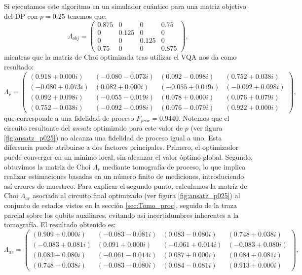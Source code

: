 \documentclass[letterpaper,12pt]{thesisECFM}
\theoremstyle{plain}
\theoremstyle{definition}
\theoremstyle{definition}
\theoremstyle{remark}
\newcommand{\1}{\mathbb{1}}
\begin{document}
Si ejecutamos este algoritmo en un simulador cuántico para una matriz objetivo del DP con $p=0.25$ tenemos que:
\begin{equation}
    \Lambda_{obj} = \begin{pmatrix}
0.875 & 0 & 0 & 0.75 \\
0 & 0.125 & 0 & 0 \\
0 & 0 & 0.125 & 0 \\
0.75 & 0 & 0 & 0.875
\end{pmatrix},
\end{equation}
mientras que la matriz de Choi optimizada tras utilizar el VQA nos da como
resultado:  
\begin{equation}
  \Lambda_r =  \begin{pmatrix}
(0.918 + 0.000i) & (-0.080 - 0.073i) & (0.092 - 0.098i) & (0.752 + 0.038i) \\
(-0.080 + 0.073i) & (0.082 + 0.000i) & (-0.055 + 0.019i) & (-0.092 + 0.098i) \\
(0.092 + 0.098i) & (-0.055 - 0.019i) & (0.078 + 0.000i) & (0.076 + 0.079i) \\
(0.752 - 0.038i) & (-0.092 - 0.098i) & (0.076 - 0.079i) & (0.922 + 0.000i)
\end{pmatrix},
\end{equation}
que corresponde a una fidelidad de proceso $F_{proc}= 0.9440$. Notemos que el
circuito resultante del \textit{ansatz} optimizado para este valor de $p$ (ver figura
\ref{fig:ansatz_p025}) no alcanza una fidelidad de proceso igual a uno. Esta diferencia puede atribuirse a dos factores principales. Primero, el optimizador puede converger en un mínimo local, sin alcanzar el valor óptimo global. Segundo, obtuvimos la matriz de Choi $\Lambda_r$ mediante tomografía de proceso, lo que implica realizar estimaciones basadas en un número finito de mediciones, introduciendo así errores de muestreo. Para explicar el segundo punto, calculamos la matriz de Choi $\Lambda_{ar}$ asociada al circuito final optimizado (ver figura \ref{fig:ansatz_p025}) al conjunto de estados vistos en la sección \ref{sec:Tomo_proc}, seguido de la traza parcial sobre los qubits auxiliares, evitando así incertidumbres inherentes a la tomografía. El resultado obtenido es:
\begin{equation}
    \Lambda_{ar} =  \begin{pmatrix}
(0.909 + 0.000i) & (-0.083 - 0.081i) & (0.083 - 0.080i) & (0.748 + 0.038i) \\
(-0.083 + 0.081i) & (0.091 + 0.000i) & (-0.061 + 0.014i) & (-0.083 + 0.080i) \\
(0.083 + 0.080i) & (-0.061 - 0.014i) & (0.087 + 0.000i) & (0.084 + 0.081i) \\
(0.748 - 0.038i) & (-0.083 - 0.080i) & (0.084 - 0.081i) & (0.913 + 0.000i)
\end{pmatrix},
\end{equation}
\end{document}
